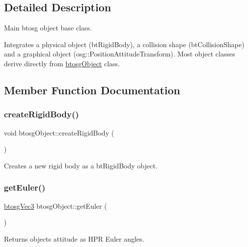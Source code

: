 \subsection{Detailed Description}
Main btosg object base class. 

Integrates a physical object (bt\+Rigid\+Body), a collision shape (bt\+Collision\+Shape) and a graphical object (osg\+::\+Position\+Attitude\+Transform). Most object classes derive directly from \hyperlink{classbtosgObject}{btosg\+Object} class. 

\subsection{Member Function Documentation}
\mbox{\label{classbtosgObject_a029dbe9134fa94e7355799f67fb2cd6d}} 
\subsubsection{\texorpdfstring{create\+Rigid\+Body()}{createRigidBody()}}
{\footnotesize\ttfamily void btosg\+Object\+::create\+Rigid\+Body (\begin{DoxyParamCaption}{ }\end{DoxyParamCaption})\hspace{0.3cm}{\ttfamily [inline]}}

Creates a new rigid body as a bt\+Rigid\+Body object. \mbox{\label{classbtosgObject_a2019ec63bde02b72600450c7c985e77a}} 
\subsubsection{\texorpdfstring{get\+Euler()}{getEuler()}}
{\footnotesize\ttfamily \hyperlink{classbtosgVec3}{btosg\+Vec3} btosg\+Object\+::get\+Euler (\begin{DoxyParamCaption}{ }\end{DoxyParamCaption})\hspace{0.3cm}{\ttfamily [inline]}}

Returns object\textquotesingle{}s attitude as H\+PR Euler angles. \mbox{\label{classbtosgObject_a3dadd5da8f2a312e44a039446b93d4cd}} 
